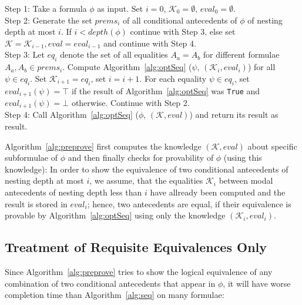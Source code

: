 \documentclass{entcs} \usepackage{entcsmacro}
\begin{document}
\begin{algorithm}[h]
\begin{alg}
\begin{upshape}
  Step 1: Take a formula $\phi$ as input. Set $i=0$, $\mathcal{K}_0=\emptyset$, $eval_0=\emptyset$.\\
  Step 2: Generate the set $prems_i$ of all conditional antecedents of $\phi$
  of nesting depth at most $i$. If $i<depth(\phi)$ continue
  with Step 3, else set $\mathcal{K}=\mathcal{K}_{i-1}, eval=eval_{i-1}$ and continue with Step 4.\\
  Step 3: Let $eq_i$ denote the set of all equalities $A_a = A_b$ for different
  formulae $A_a,A_b\in prems_i$. Compute
  Algorithm~\ref{alg:optSeq} ($\psi$, $(\mathcal{K}_i,eval_i)$) for all $\psi\in eq_i$.
  Set $\mathcal{K}_{i+1} = eq_i$, set $i = i + 1$. For each equality $\psi\in eq_i$,
  set $eval_{i+1}(\psi)=\top$ if the result of Algorithm~\ref{alg:optSeq} was \verb+True+
  and $eval_{i+1}(\psi)=\bot$ otherwise. Continue with Step 2.\\
  Step 4: Call Algorithm~\ref{alg:optSeq} ($\phi$, $(\mathcal{K},eval)$) and return its result
  as result.
\label{alg:preprove}
\end{upshape}
\end{alg}
\end{algorithm}

Algorithm~\ref{alg:preprove} first computes the knowledge $(\mathcal{K},eval)$ about specific 
subformulae of $\phi$ and then finally checks for provability of
$\phi$ (using this knowledge): In order to show the equivalence of
two conditional antecedents of nesting depth at most $i$, we assume,
that the equalities $\mathcal{K}_{i}$ between modal antecedents of nesting depth less
than $i$ have allready been computed and the result is stored in $eval_i$; hence,
two antecedents are equal, if their equivalence is provable by
Algorithm~\ref{alg:optSeq} using only the knowledge $(\mathcal{K}_{i},eval_i)$.

\subsection{Treatment of Requisite Equivalences Only}

Since Algorithm~\ref{alg:preprove} tries to show the logical equivalence of any combination
of two conditional antecedents that appear in $\phi$, it will have worse completion
time than Algorithm~\ref{alg:seq} on many formulae:
\end{document}
